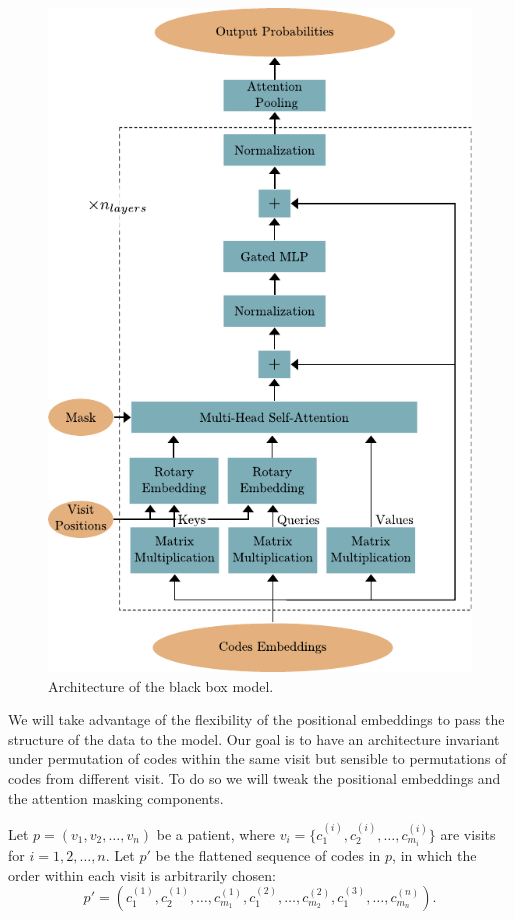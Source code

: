 \documentclass[]{marticle}
\begin{document}
\begin{figure}[!ht] 
\center
\includegraphics{kelso_architecture.pdf}
\caption{Architecture of the black box model.} 
\label{fig:kelso-architecture} 
\end{figure}

We will take advantage of the flexibility of the positional embeddings to pass the structure of the
data to the model. Our goal is to have an architecture invariant under permutation of codes within
the same visit but sensible to permutations of codes from different visit. To do so we will tweak
the positional embeddings and the attention masking components.

Let $p=(v_1, v_2, \dots, v_n)$ be a patient, where $v_i=\{c^{(i)}_1, c^{(i)}_2,
\dots, c^{(i)}_{m_i}\}$ are visits for $i=1,2,\dots, n$. Let $p'$ be the flattened sequence of codes
in $p$, in which the order within each visit is arbitrarily chosen:
\begin{equation*}
    p' = (c^{(1)}_1, c^{(1)}_2, \dots, c^{(1)}_{m_1}, c^{(2)}_1, \dots, c^{(2)}_{m_2}, c^{(3)}_1,
    \dots, c^{(n)}_{m_n}).
\end{equation*}
\end{document}
